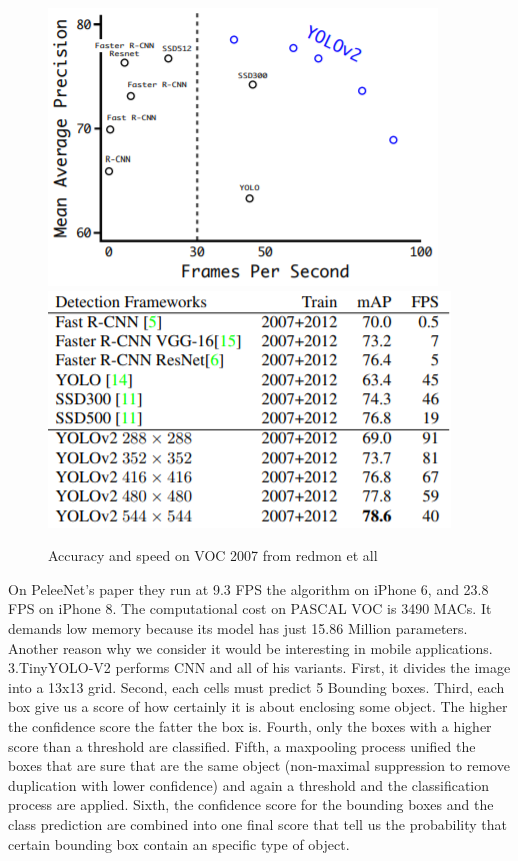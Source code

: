 \documentclass[10pt]{article}
\begin{document}
\begin{figure}[H]
  	\centering
    \includegraphics[scale=0.9]{YOLOV2.PNG}
    \includegraphics[scale=1]{YOLOV22.PNG}
    \caption{ Accuracy and speed on VOC 2007 from redmon et all \cite{redmon2017yolo9000}}
\end{figure}

On PeleeNet's paper\cite{wang2018pelee} they run at 9.3 FPS the algorithm on iPhone 6, and 23.8 FPS on iPhone 8. The computational cost on PASCAL VOC is 3490 MACs. It demands low memory because its model has just 15.86 Million parameters. Another reason why we consider it would be interesting in mobile applications.\\


3.TinyYOLO-V2 performs CNN and all of his variants.
First, it divides the image into a 13x13 grid. Second, each cells must predict 5 Bounding boxes. Third, each box give us a score of how certainly it is about enclosing some object. The higher the conﬁdence score the fatter the box is. Fourth, only the boxes with a higher score than a threshold are classiﬁed. Fifth, a maxpooling process uniﬁed the boxes that are sure that are the same object (non-maximal suppression to remove duplication with lower confidence) and again a threshold and the classiﬁcation process are applied. Sixth, the conﬁdence score for the bounding boxes and the class prediction are combined into one ﬁnal score that tell us the probability that certain bounding box contain an speciﬁc type of object. 
\end{document}

